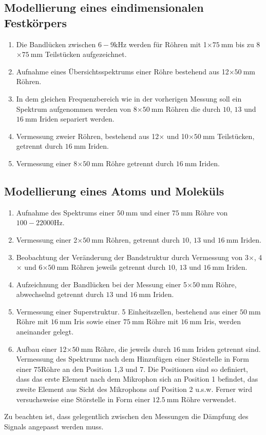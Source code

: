 \subsection{Modellierung eines eindimensionalen Festkörpers}
\label{sec:Durchf3}
\begin{enumerate}
\item Die Bandlücken zwischen $6-9\si{\kilo\hertz}$ werden für Röhren mit 1$\times$$\SI{75}{\milli\meter}$ bis zu 8$\times$$\SI{75}{\milli\meter}$ Teilstücken aufgezeichnet.
\item Aufnahme eines Übersichtsspektrums einer Röhre bestehend aus 12$\times$$\SI{50}{\milli\meter}$ Röhren.
\item In dem gleichen Frequenzbereich wie in der vorherigen Messung soll ein Spektrum aufgenommen werden von 8$\times$$\SI{50}{\milli\meter}$ Röhren die durch $10$, $13$ und $\SI{16}{\milli\meter}$ Iriden separiert werden.
\item Vermessung zweier Röhren, bestehend aus 12$\times$ und 10$\times$$\SI{50}{\milli\meter}$ Teilstücken, getrennt durch $\SI{16}{\milli\meter}$ Iriden.
\item Vermessung einer 8$\times$$\SI{50}{\milli\meter}$ Röhre getrennt durch $\SI{16}{\milli\meter}$ Iriden.
\end{enumerate}

\subsection{Modellierung eines Atoms und Moleküls}
\begin{enumerate}
\item Aufnahme des Spektrums einer $\SI{50}{\milli\meter}$ und einer $\SI{75}{\milli\meter}$ Röhre von $100-22000\si{\hertz}$.
\item Vermessung einer 2$\times$$\SI{50}{\milli\meter}$ Röhren, getrennt durch $10$, $13$ und $\SI{16}{\milli\meter}$ Iriden.
\item Beobachtung der Veränderung der Bandstruktur durch Vermessung von 3$\times$, 4$\times$ und 6$\times$$\SI{50}{\milli\meter}$ Röhren jeweils getrennt durch $10$, $13$ und $\SI{16}{\milli\meter}$ Iriden.
\item Aufzeichnung der Bandlücken bei der Messung einer 5$\times$$\SI{50}{\milli\meter}$ Röhre, abwechselnd getrennt durch $13$ und $\SI{16}{\milli\meter}$ Iriden.
\item Vermessung einer Superstruktur. 5 Einheitszellen, bestehend aus einer $\SI{50}{\milli\meter}$ Röhre mit $\SI{16}{\milli\meter}$ Iris sowie einer $\SI{75}{\milli\meter}$ Röhre mit $\SI{16}{\milli\meter}$ Iris, werden aneinander gelegt.
\item Aufbau einer 12$\times$$\SI{50}{\milli\meter}$ Röhre, die jeweils durch $\SI{16}{\milli\meter}$ Iriden getrennt sind. Vermessung des Spektrums nach dem Hinzufügen einer Störstelle in Form einer $75 $Röhre an den Position 1,3 und 7. Die Positionen sind so definiert, dass das erste Element nach dem Mikrophon sich an Position 1 befindet, das zweite Element aus Sicht des Mikrophons auf Position 2 u.s.w. Ferner wird versuchsweise eine Störstelle in Form einer $\SI{12.5}{\milli\meter}$ Röhre verwendet.
\end{enumerate}

Zu beachten ist, dass gelegentlich zwischen den Messungen die Dämpfung des Signals angepasst werden muss.
